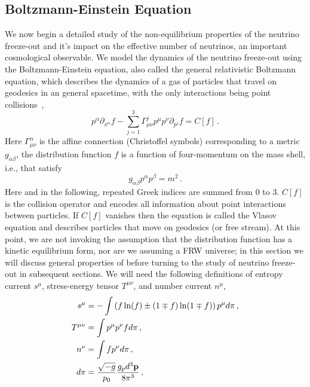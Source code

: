 \subsection{Boltzmann-Einstein Equation}\label{sec:Boltzmann_Einstein}
We now begin a detailed study of the non-equilibrium properties of the neutrino freeze-out and it's impact on the effective number of neutrinos, an important cosmological observable. We model the dynamics of the neutrino freeze-out using the Boltzmann-Einstein equation, also called the general relativistic Boltzmann equation, which describes the dynamics of a gas of particles that travel on geodesics in an general spacetime, with the only interactions being point collisions~\cite{Andreasson:2011ng,cercignani,Choquet-Bruhat:2009xil,ehlers},
\begin{equation}\label{boltzmann_einstein}
p^\alpha\partial_{x^\alpha}f-\sum_{j=1}^3\Gamma^j_{\mu\nu}p^\mu p^\nu\partial_{p^j}f=C[f]\,.
\end{equation}
Here $ \Gamma^\alpha_{\mu\nu}$ is the affine connection (Christoffel symbols) corresponding to a metric $g_{\alpha\beta}$,   the distribution function $f$ is a function of four-momentum on the mass shell, i.e., that satisfy
 \begin{equation}
g_{\alpha\beta}p^\alpha p^\beta=m^2\,.
\end{equation}
Here and in the following,  repeated Greek indices are summed from $0$ to $3$.  $C[f]$ is the collision operator and encodes all information about point interactions between particles.  If $C[f]$ vanishes then the equation is called the Vlasov equation and describes particles that move on geodesics (or free stream).  At this point, we are  not invoking the assumption that the distribution function has a kinetic equilibrium form, nor are we assuming a FRW universe; in this section we will discuss  general properties of  before turning to the study of neutrino freeze-out in subsequent sections.   We will need the following definitions of entropy current $s^\mu$, stress-energy tensor ${T}^{\mu\nu}$, and number current $n^\mu$,
\begin{align}
\label{smdef} s^\mu&=-\int \left(f\ln(f)\pm(1\mp f)\ln(1\mp f)\right)p^\mu d\pi\,,\\
\label{Tmndef}{T}^{\mu\nu}&=\int p^\mu p^\nu f d\pi\,,\\
\label{nmdef} n^\nu&=\int f p^\nu d\pi\,,\\
d\pi&=\frac{\sqrt{-g}}{p_0}\frac{g_pd^3{\bf p}}{8\pi^3}\,,
\end{align}
